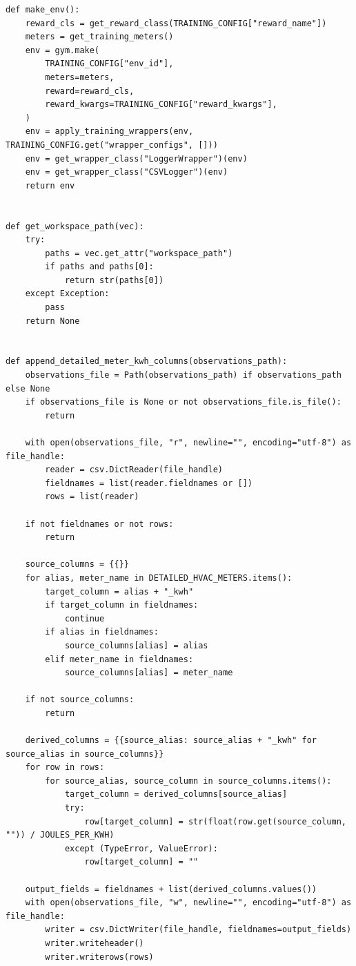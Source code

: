 \documentclass[10pt,a4paper]{article}
\begin{document}
\begin{lstlisting}[style=studioPython,caption={backend/training\_scripts.py},label={lst:backend-training-scripts-py}]
def make_env():
    reward_cls = get_reward_class(TRAINING_CONFIG["reward_name"])
    meters = get_training_meters()
    env = gym.make(
        TRAINING_CONFIG["env_id"],
        meters=meters,
        reward=reward_cls,
        reward_kwargs=TRAINING_CONFIG["reward_kwargs"],
    )
    env = apply_training_wrappers(env, TRAINING_CONFIG.get("wrapper_configs", []))
    env = get_wrapper_class("LoggerWrapper")(env)
    env = get_wrapper_class("CSVLogger")(env)
    return env


def get_workspace_path(vec):
    try:
        paths = vec.get_attr("workspace_path")
        if paths and paths[0]:
            return str(paths[0])
    except Exception:
        pass
    return None


def append_detailed_meter_kwh_columns(observations_path):
    observations_file = Path(observations_path) if observations_path else None
    if observations_file is None or not observations_file.is_file():
        return

    with open(observations_file, "r", newline="", encoding="utf-8") as file_handle:
        reader = csv.DictReader(file_handle)
        fieldnames = list(reader.fieldnames or [])
        rows = list(reader)

    if not fieldnames or not rows:
        return

    source_columns = {{}}
    for alias, meter_name in DETAILED_HVAC_METERS.items():
        target_column = alias + "_kwh"
        if target_column in fieldnames:
            continue
        if alias in fieldnames:
            source_columns[alias] = alias
        elif meter_name in fieldnames:
            source_columns[alias] = meter_name

    if not source_columns:
        return

    derived_columns = {{source_alias: source_alias + "_kwh" for source_alias in source_columns}}
    for row in rows:
        for source_alias, source_column in source_columns.items():
            target_column = derived_columns[source_alias]
            try:
                row[target_column] = str(float(row.get(source_column, "")) / JOULES_PER_KWH)
            except (TypeError, ValueError):
                row[target_column] = ""

    output_fields = fieldnames + list(derived_columns.values())
    with open(observations_file, "w", newline="", encoding="utf-8") as file_handle:
        writer = csv.DictWriter(file_handle, fieldnames=output_fields)
        writer.writeheader()
        writer.writerows(rows)



\end{lstlisting}
\end{document}
